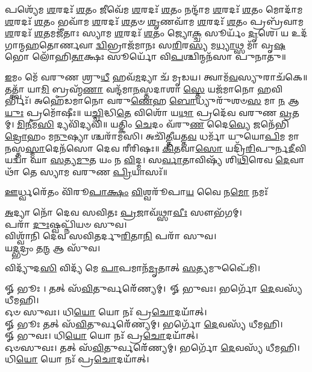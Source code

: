 𑌪𑌶𑍍𑌯𑍇᳴𑌮 \ul{𑌶}\-𑌰𑌦𑌃᳴ \ul{𑌶}\-𑌤𑌂 𑌜𑍀𑌵𑍇᳴𑌮 \ul{𑌶}\-𑌰𑌦𑌃᳴ \ul{𑌶}\-𑌤𑌂 𑌨𑌨𑍍𑌦𑌾᳴𑌮 \ul{𑌶}\-𑌰𑌦𑌃᳴ \ul{𑌶}\-𑌤𑌂 𑌮𑍋𑌦𑌾᳴𑌮 \ul{𑌶}\-𑌰𑌦𑌃᳴ \ul{𑌶}\-𑌤𑌂 𑌭𑌵𑌾᳴𑌮 \ul{𑌶}\-𑌰𑌦𑌃᳴ \ul{𑌶}\-𑌤𑍞 \ul{𑌶𑍃}\-𑌣𑌵𑌾᳴𑌮 \ul{𑌶}\-𑌰𑌦𑌃᳴ \ul{𑌶}\-𑌤𑌂 𑌪𑍍𑌰𑌬𑍍𑌰᳴𑌵𑌾𑌮 \ul{𑌶}\-𑌰𑌦𑌃᳴ \ul{𑌶}\-𑌤𑌮𑌜𑍀᳴𑌤𑌾𑌃 𑌸𑍍𑌯𑌾𑌮 \ul{𑌶}\-𑌰𑌦𑌃᳴ \ul{𑌶}\-𑌤𑌂 𑌜𑍍𑌯𑍋\-\ul{𑌕𑍍𑌚} 𑌸𑍂𑌰𑍍𑌯𑌂᳴ \ul{𑌦𑍃}\-𑌶𑍇। 𑌯 𑌉𑌦᳴𑌗𑌾𑌨𑍍𑌮\-\ul{𑌹}\-𑌤𑍋𑌰𑍍𑌣𑌵𑌾\-\ul{𑌦𑍍𑌵𑌿}\-𑌭𑍍𑌰𑌾𑌜᳴𑌮𑌾𑌨𑌃 𑌸\-\ul{𑌰𑌿}\-𑌰\-\ul{𑌸𑍍𑌯} 𑌮\-\ul{𑌧𑍍𑌯𑌾}\-𑌥𑍍𑌸 𑌮𑌾᳴ 𑌵𑍃\-\ul{𑌷}\-𑌭𑍋 𑌲𑍋᳴𑌹𑌿\-\ul{𑌤𑌾}\-𑌕𑍍𑌷𑌃 𑌸𑍂𑌰𑍍𑌯𑍋᳴ 𑌵𑌿\-\ul{𑌪}\-𑌶𑍍𑌚𑌿𑌨𑍍𑌮𑌨᳴𑌸𑌾 𑌪𑍁𑌨𑌾𑌤𑍁॥

\-\ul{𑌇}\-𑌮𑌂 𑌮𑍇᳴ 𑌵𑌰𑍁𑌣 𑌶𑍍𑌰𑍁\-\ul{𑌧𑍀} 𑌹𑌵᳴\-\ul{𑌮}\-𑌦𑍍𑌯𑌾 𑌚᳴ 𑌮𑍃𑌡𑌯। 𑌤𑍍𑌵𑌾𑌮᳴\-\ul{𑌵}\-𑌸𑍍𑌯𑍁𑌰𑌾𑌚᳴𑌕𑍇॥ 𑌤𑌤𑍍𑌤𑍍𑌵𑌾᳴ 𑌯𑌾\-\ul{𑌮𑌿} 𑌬𑍍𑌰𑌹𑍍𑌮᳴\-\ul{𑌣𑌾} 𑌵𑌨𑍍𑌦᳴𑌮𑌾\-\ul{𑌨}\-𑌸𑍍𑌤𑌦𑌾𑌶𑌾\-\ul{𑌸𑍍𑌤𑍇} 𑌯𑌜᳴𑌮𑌾𑌨𑍋 \ul{𑌹}\-𑌵𑌿𑌰𑍍𑌭𑌿𑌃᳴। 𑌅𑌹𑍇᳴𑌡𑌮𑌾𑌨𑍋 𑌵𑌰𑍁\-\ul{𑌣𑍇}\-𑌹 \ul{𑌬𑍋}\-𑌧𑍍𑌯𑍁𑌰𑍁᳴𑌶𑍞\-\ul{𑌸} 𑌮𑌾 \ul{𑌨} 𑌆\-\ul{𑌯𑍁𑌃} 𑌪𑍍𑌰𑌮𑍋᳴𑌷𑍀𑌃॥
𑌯\-\ul{𑌚𑍍𑌚𑌿}\-𑌦𑍍𑌧𑌿\-\ul{𑌤𑍇} 𑌵𑌿𑌶𑍋᳴ 𑌯\-\ul{𑌥𑌾} 𑌪𑍍𑌰𑌦𑍇᳴𑌵 𑌵𑌰𑍁𑌣 \ul{𑌵𑍍𑌰}\-𑌤𑌮𑍍। \ul{𑌮𑌿}\-\-\ul{𑌨𑍀}\-𑌮\-\ul{𑌸𑌿} 𑌦𑍍𑌯𑌵𑌿᳴𑌦𑍍𑌯𑌵𑌿॥ 𑌯𑌤𑍍𑌕𑌿𑌂 \ul{𑌚𑍇}\-𑌦𑌂 𑌵᳴𑌰𑍁\-\ul{𑌣} 𑌦𑍈\-\ul{𑌵𑍍𑌯𑍇} 𑌜𑌨𑍇᳴𑌭𑌿\-\ul{𑌦𑍍𑌰𑍋}\-𑌹𑌂 𑌮\-\ul{𑌨𑍁}\-𑌷𑍍𑌯𑌾𑌶𑍍𑌚𑌰𑌾᳴𑌮𑌸𑌿। 𑌅𑌚𑌿᳴\-\ul{𑌤𑍍𑌤𑍀}\-𑌯𑌤𑍍𑌤\-\ul{𑌵} 𑌧𑌰𑍍𑌮𑌾᳴ 𑌯𑍁𑌯𑍋\-\ul{𑌪𑌿}\-𑌮 𑌮𑌾 \ul{𑌨}\-𑌸𑍍𑌤\-\ul{𑌸𑍍𑌮𑌾}\-𑌦𑍇𑌨᳴𑌸𑍋 𑌦𑍇𑌵 𑌰𑍀𑌰𑌿𑌷𑌃॥ \ul{𑌕𑌿}\-\-\ul{𑌤}\-𑌵𑌾\-\ul{𑌸𑍋} 𑌯𑌦𑍍𑌰𑌿᳴\-\ul{𑌰𑌿}\-𑌪𑍁𑌰𑍍𑌨\-\ul{𑌦𑍀}\-𑌵𑌿 𑌯𑌦𑍍𑌵𑌾᳴ 𑌘𑌾 \ul{𑌸}\-𑌤𑍍𑌯\-\ul{𑌮𑍁}\-𑌤 𑌯𑌂 𑌨 \ul{𑌵𑌿}\-𑌦𑍍𑌮। 𑌸\-\ul{𑌰𑍍𑌵𑌾}\-𑌤𑌾𑌵𑌿𑌷𑍍𑌯᳴ 𑌶𑌿\-\ul{𑌥𑌿}\-𑌰𑍇𑌵 \ul{𑌦𑍇}\-𑌵𑌾𑌥𑌾᳴ 𑌤𑍇 𑌸𑍍𑌯𑌾𑌮 𑌵𑌰𑍁𑌣 \ul{𑌪𑍍𑌰𑌿}\-𑌯𑌾𑌸𑌃᳴॥


{\-\ul{𑌊}\-𑌰𑍍𑌧𑍍𑌵𑌰𑍇᳴𑌤𑌂 𑌵𑌿᳴𑌰𑍂\-\ul{𑌪𑌾}\-\-\ul{𑌕𑍍𑌷𑌂} \ul{𑌵𑌿}\-𑌶𑍍𑌵𑌰𑍂᳴𑌪𑌾\-\ul{𑌯} 𑌵𑍈 𑌨\-\ul{𑌮𑍋} 𑌨𑌮𑌃᳴}




\-\ul{𑌅}\-𑌦𑍍𑌯𑌾 𑌨𑍋᳴ 𑌦𑍇𑌵 𑌸𑌵𑌿𑌤𑌃 \ul{𑌪𑍍𑌰}\-𑌜𑌾𑌵᳴𑌥𑍍𑌸𑌾\-\ul{𑌵𑍀𑌃} 𑌸𑍗𑌭᳴𑌗𑌮𑍍।\\
𑌪𑌰𑌾᳴ \ul{𑌦𑍁𑌃}\-𑌷𑍍𑌵𑌪𑍍𑌨𑌿᳴𑌯𑍞 𑌸𑍁𑌵।\\
𑌵𑌿𑌶𑍍𑌵𑌾᳴𑌨𑌿 𑌦𑍇𑌵 𑌸𑌵𑌿𑌤𑌰𑍍𑌦𑍁\-\ul{𑌰𑌿}\-𑌤𑌾\-\ul{𑌨𑌿} 𑌪𑌰𑌾᳴ 𑌸𑍁𑌵।\\
𑌯\-\ul{𑌦𑍍𑌭}\-𑌦𑍍𑌰𑌂 𑌤\-\ul{𑌨𑍍𑌮} 𑌆 𑌸𑍁᳴𑌵।


𑌵𑌿𑌦𑍍𑌯𑍁᳴𑌦\-\ul{𑌸𑌿} 𑌵𑌿𑌦𑍍𑌯᳴ 𑌮𑍇 \ul{𑌪𑌾}\-𑌪𑌮𑌾𑌨᳴\-\ul{𑌮𑍃}\-𑌤𑌾𑌤𑍍 \ul{𑌸}\-𑌤𑍍𑌯𑌮𑍁𑌪𑍈᳴𑌮𑌿।


𑍐 𑌭𑍂𑌃 । 𑌤𑌤𑍍 𑌸᳴\-\ul{𑌵𑌿}\-𑌤𑍁𑌰𑍍𑌵𑌰𑍇᳴᳴𑌣𑍍𑌯𑌮𑍍।\
𑍐 𑌭𑍁𑌵𑌃। 𑌭𑌰𑍍𑌗𑍋᳴ \ul{𑌦𑍇}\-𑌵𑌸𑍍𑌯᳴ 𑌧𑍀𑌮𑌹𑌿।\\
𑌓𑍞 𑌸𑍁𑌵𑌃। 𑌧𑌿\-\ul{𑌯𑍋} 𑌯𑍋 𑌨𑌃᳴ 𑌪𑍍𑌰\-\ul{𑌚𑍋}\-𑌦𑌯𑌾᳴᳴𑌤𑍍।\\
𑍐 𑌭𑍂𑌃 𑌤𑌤𑍍 𑌸᳴\-\ul{𑌵𑌿}\-𑌤𑍁𑌰𑍍𑌵𑌰𑍇᳴᳴𑌣𑍍𑌯𑌮𑍍। 𑌭𑌰𑍍𑌗𑍋᳴ \ul{𑌦𑍇}\-𑌵𑌸𑍍𑌯᳴ 𑌧𑍀𑌮𑌹𑌿।\\
𑍐 𑌭𑍁𑌵𑌃। 𑌧𑌿\-\ul{𑌯𑍋} 𑌯𑍋 𑌨𑌃᳴ 𑌪𑍍𑌰\-\ul{𑌚𑍋}\-𑌦𑌯𑌾᳴᳴𑌤𑍍।\\
𑌓𑍞𑌸𑍁𑌵𑌃। 𑌤𑌤𑍍 𑌸᳴\-\ul{𑌵𑌿}\-𑌤𑍁𑌰𑍍𑌵𑌰𑍇᳴᳴𑌣𑍍𑌯𑌮𑍍। 𑌭𑌰𑍍𑌗𑍋᳴ \ul{𑌦𑍇}\-𑌵𑌸𑍍𑌯᳴ 𑌧𑍀𑌮𑌹𑌿। 𑌧𑌿\-\ul{𑌯𑍋} 𑌯𑍋 𑌨𑌃᳴ 𑌪𑍍𑌰\-\ul{𑌚𑍋}\-𑌦𑌯𑌾᳴᳴𑌤𑍍।\\


